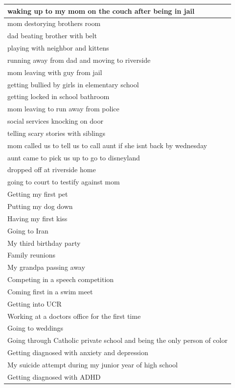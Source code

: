 \documentclass[
  .7em,
  letterpaper,
  DIV=11,
  numbers=noendperiod]{scrartcl}
\begin{document}
\begin{table}
\begin{tabular}{l}
\hline
waking up to my mom on the couch after being in jail\\
\hline
mom destorying brothers room\\
\hline
dad beating brother with belt\\
\hline
playing with neighbor and kittens\\
\hline
running away from dad and moving to riverside\\
\hline
mom leaving with guy from jail\\
\hline
getting bullied by girls in elementary school\\
\hline
getting locked in school bathroom\\
\hline
mom leaving to run away from police\\
\hline
social services knocking on door\\
\hline
telling scary stories with siblings\\
\hline
mom called us to tell us to call aunt if she isnt back by wednesday\\
\hline
aunt came to pick us up to go to disneyland\\
\hline
dropped off at riverside home\\
\hline
going to court to testify against mom\\
\hline
Getting my first pet\\
\hline
Putting my dog down\\
\hline
Having my first kiss\\
\hline
Going to Iran\\
\hline
My third birthday party\\
\hline
Family reunions\\
\hline
My grandpa passing away\\
\hline
Competing in a speech competition\\
\hline
Coming first in a swim meet\\
\hline
Getting into UCR\\
\hline
Working at a doctors office for the first time\\
\hline
Going to weddings\\
\hline
Going through Catholic private school and being the only person of color\\
\hline
Getting diagnosed with anxiety and depression\\
\hline
My suicide attempt during my junior year of high school\\
\hline
Getting diagnosed with ADHD\\
\hline

\end{tabular}
\end{table}
\end{document}
